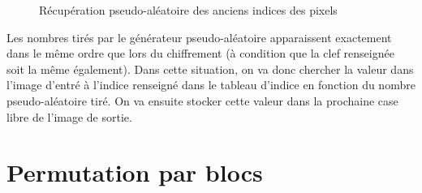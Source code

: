 \documentclass[a4paper]{article}
\begin{document}
        \begin{figure}[htbp]
            \begin{center}
                \caption{Récupération pseudo-aléatoire des anciens indices des pixels}
                \label{fig:decipher}
            \end{center}
        \end{figure}

        Les nombres tirés par le générateur pseudo-aléatoire apparaissent exactement dans le même ordre que lors du chiffrement (à condition que la clef renseignée soit la même également).
        Dans cette situation, on va donc chercher la valeur dans l'image d'entré à l'indice renseigné dans le tableau d'indice en fonction du nombre pseudo-aléatoire tiré. On va ensuite stocker cette valeur dans la prochaine case libre de l'image de sortie.

    \section{Permutation par blocs}
\end{document}
